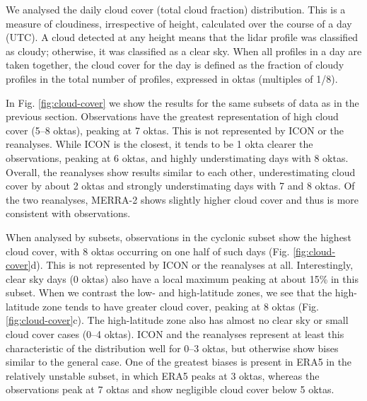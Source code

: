 \documentclass[12pt,a4paper]{article}
\begin{document}
We analysed the daily cloud cover (total cloud fraction) distribution. This is
a measure of cloudiness, irrespective of height, calculated over the course of
a day (UTC). A cloud detected at any height means that the lidar profile was
classified as cloudy; otherwise, it was classified as a clear sky. When all
profiles in a day are taken together, the cloud cover for the day is defined as
the fraction of cloudy profiles in the total number of profiles, expressed in
oktas (multiples of 1/8).

In Fig.  \ref{fig:cloud-cover} we show the results for the same subsets of data
as in the previous section. Observations have the greatest representation of
high cloud cover (5--8 oktas), peaking at 7 oktas. This is not represented by
ICON or the reanalyses.  While ICON is the closest, it tends to be 1 okta
clearer the observations, peaking at 6 oktas, and highly understimating days
with 8 oktas.  Overall, the reanalyses show results similar to each other,
underestimating cloud cover by about 2 oktas and strongly understimating days
with 7 and 8 oktas. Of the two reanalyses, MERRA-2 shows slightly higher cloud
cover and thus is more consistent with observations.

When analysed by subsets, observations in the cyclonic subset show the highest
cloud cover, with 8 oktas occurring on one half of such days (Fig.
\ref{fig:cloud-cover}d).  This is not represented by ICON or the reanalyses at
all. Interestingly, clear sky days (0 oktas) also have a local maximum peaking
at about 15\% in this subset.  When we contrast the low- and high-latitude
zones, we see that the high-latitude zone tends to have greater cloud cover,
peaking at 8 oktas (Fig.  \ref{fig:cloud-cover}c). The high-latitude zone also
has almost no clear sky or small cloud cover cases (0--4 oktas). ICON and the
reanalyses represent at least this characteristic of the distribution well for
0--3 oktas, but otherwise show bises similar to the general case. One of the
greatest biases is present in ERA5 in the relatively unstable subset, in which
ERA5 peaks at 3 oktas, whereas the observations peak at 7 oktas and show
negligible cloud cover below 5 oktas.
\end{document}
